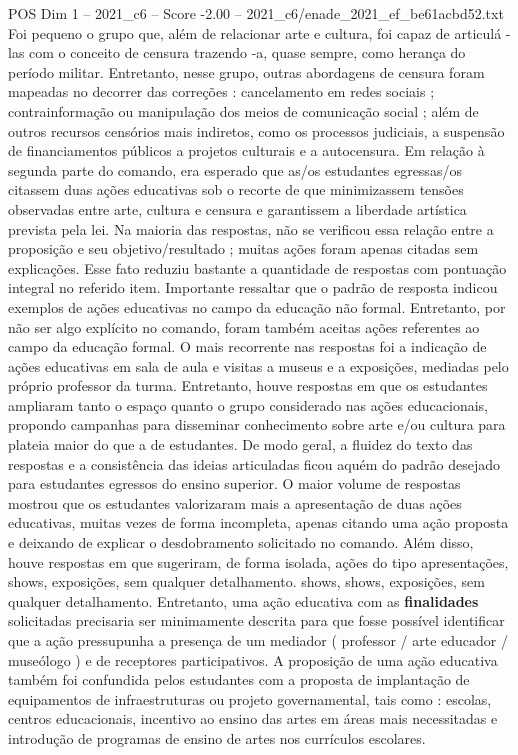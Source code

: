 \begin{textsample}{POS Dim 1 – 2021\_c6 – Score -2.00 – 2021\_c6/enade\_2021\_ef\_be61acbd52.txt}
Foi pequeno o grupo que, além de relacionar arte e cultura, foi capaz de articulá -las com o conceito de censura trazendo -a, quase sempre, como herança do período militar.
Entretanto, nesse grupo, outras abordagens de censura foram mapeadas no decorrer das correções : cancelamento em redes sociais ; contrainformação ou manipulação dos meios de comunicação social ; além de outros recursos censórios mais indiretos, como os processos judiciais, a suspensão de financiamentos públicos a projetos culturais e a autocensura.
Em relação à segunda parte do comando, era esperado que as/os estudantes egressas/os citassem duas ações educativas sob o recorte de que minimizassem tensões observadas entre arte, cultura e censura e garantissem a liberdade artística prevista pela lei.
Na maioria das respostas, não se verificou essa relação entre a proposição e seu objetivo/resultado ; muitas ações foram apenas citadas sem explicações.
Esse fato reduziu bastante a quantidade de respostas com pontuação integral no referido item.
Importante ressaltar que o padrão de resposta indicou exemplos de ações educativas no campo da educação não formal.
Entretanto, por não ser algo explícito no comando, foram também aceitas ações referentes ao campo da educação formal.
O mais recorrente nas respostas foi a indicação de ações educativas em sala de aula e visitas a museus e a exposições, mediadas pelo próprio professor da turma.
Entretanto, houve respostas em que os estudantes ampliaram tanto o espaço quanto o grupo considerado nas ações educacionais, propondo campanhas para disseminar conhecimento sobre arte e/ou cultura para plateia maior do que a de estudantes.
De modo geral, a fluidez do texto das respostas e a consistência das ideias articuladas ficou aquém do padrão desejado para estudantes egressos do ensino superior.
O maior volume de respostas mostrou que os estudantes valorizaram mais a apresentação de duas ações educativas, muitas vezes de forma incompleta, apenas citando uma ação proposta e deixando de explicar o desdobramento solicitado no comando.
Além disso, houve respostas em que sugeriram, de forma isolada, ações do tipo apresentações, shows, exposições, sem qualquer detalhamento. shows, shows, exposições, sem qualquer detalhamento.
Entretanto, uma ação educativa com as \textbf{finalidades} solicitadas precisaria ser minimamente descrita para que fosse possível identificar que a ação pressupunha a presença de um mediador ( professor / arte educador / museólogo ) e de receptores participativos.
A proposição de uma ação educativa também foi confundida pelos estudantes com a proposta de implantação de equipamentos de infraestruturas ou projeto governamental, tais como : escolas, centros educacionais, incentivo ao ensino das artes em áreas mais necessitadas e introdução de programas de ensino de artes nos currículos escolares.

\end{textsample}
